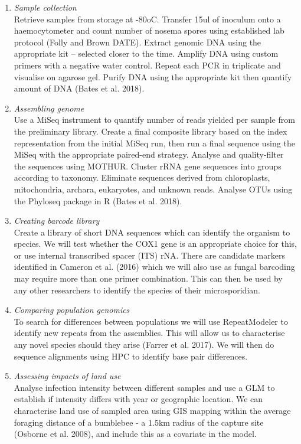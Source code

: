 \documentclass[11pt]{article}
\begin{document}
\begin{enumerate}

	\item \textit{Sample collection} \\

Retrieve samples from storage at -80oC. Transfer 15ul of inoculum onto a haemocytometer and count number of nosema spores using established lab protocol (Folly and Brown DATE). Extract genomic DNA using the appropriate kit – selected closer to the time. Amplify DNA using custom primers with a negative water control. Repeat each PCR in triplicate and visualise on agarose gel. Purify DNA using the appropriate kit then quantify amount of DNA (Bates et al. 2018).

	\item \textit{Assembling genome} \\

Use a MiSeq instrument to quantify number of reads yielded per sample from the preliminary library. Create a final composite library based on the index representation from the initial MiSeq run, then run a final sequence using the MiSeq with the appropriate paired-end strategy. Analyse and quality-filter the sequences using MOTHUR. Cluster rRNA gene sequences into groups according to taxonomy. Eliminate sequences derived from chloroplasts, mitochondria, archara, eukaryotes, and unknown reads. Analyse OTUs using the Phyloseq package in R (Bates et al. 2018).

	\item \textit{Creating barcode library} \\

Create a library of short DNA sequences which can identify the organism to species. We will test whether the COX1 gene is an appropriate choice for this, or use internal transcribed spacer (ITS) rNA. There are candidate markers identified in Cameron et al. (2016) which we will also use as fungal barcoding may require more than one primer combination.  This can then be used by any other researchers to identify the species of their microsporidian.

	\item \textit{Comparing population genomics} \\

To search for differences between populations we will use RepeatModeler to identify new repeats from the assemblies. This will allow us to characterise any novel species should they arise (Farrer et al. 2017). We will then do sequence alignments using HPC to identify base pair differences.

	\item \textit{Assessing impacts of land use} \\

Analyse infection intensity between different samples and use a GLM to establish if intensity differs with year or geographic location. We can characterise land use of sampled area using GIS mapping within the average foraging distance of a bumblebee - a 1.5km radius of the capture site (Osborne et al. 2008), and include this as a covariate in the model.

\end{enumerate}
	
\end{document}
